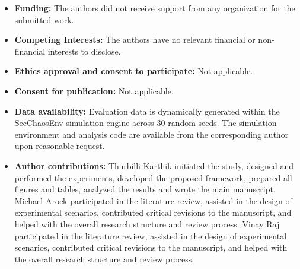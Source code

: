 \documentclass[pdflatex,sn-mathphys-num]{sn-jnl}%
\theoremstyle{thmstyleone}%
\theoremstyle{thmstyletwo}%
\theoremstyle{thmstylethree}%
\begin{document}
	\begin{itemize}
		\item \textbf{Funding:} The authors did not receive support from any organization for the submitted work.
		\item \textbf{Competing Interests:} The authors have no relevant financial or non-financial interests to disclose.
		\item \textbf{Ethics approval and consent to participate:} Not applicable.
		\item \textbf{Consent for publication:} Not applicable.
		\item \textbf{Data availability:} Evaluation data is dynamically generated within the SecChaosEnv simulation engine across 30 random seeds. The simulation environment and analysis code are available from the corresponding author upon reasonable request.
		\item \textbf{Author contributions:} Thurbilli Karthik initiated the study, designed and performed the experiments, developed the proposed framework, prepared all figures and tables, analyzed the results and wrote the main manuscript. Michael Arock participated in the literature review, assisted in the design of experimental scenarios, contributed critical revisions to the manuscript, and helped with the overall research structure and review process. Vinay Raj participated in the literature review, assisted in the design of experimental scenarios, contributed critical revisions to the manuscript, and helped with the overall research structure and review process.
	\end{itemize}
	
	\noindent
	
	
\end{document}
